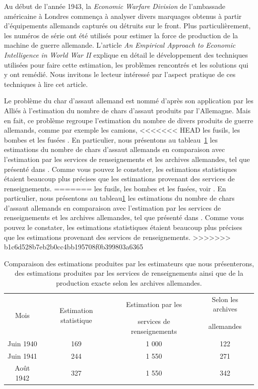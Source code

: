 \documentclass[10pt]{article}
\begin{document}
Au début de l'année 1943, la \emph{Economic Warfare Division} de
l'ambassade américaine à Londres commença à analyser divers marquages
obtenus à partir d'équipements allemands capturés ou détruits sur le
front. Plus particulièrement, les numéros de série ont été utilisés pour
estimer la force de production de la machine de guerre allemande.
L'article \emph{An Empirical Approach to Economic Intelligence in World
War II} \cite{Ruggles1947} explique en détail le développement des
techniques utilisées pour faire cette estimation, les problèmes
rencontrés et les solutions qui y ont remédié. Nous invitons le lecteur
intéressé par l'aspect pratique de ces techniques à lire cet article.

Le problème du char d'assaut allemand est nommé d'après son application
par les Alliés à l'estimation du nombre de chars d'assaut produits par
l'Allemagne. Mais en fait, ce problème regroupe l'estimation du nombre
de divers produits de guerre allemands, comme par exemple les camions,
<<<<<<< HEAD
les fusils, les bombes et les fusées \cite{Ruggles1947}. En particulier,
nous présentons au tableau~\ref{tab:estimation_ruggles} les estimations
du nombre de chars d'assaut allemands en comparaison avec l'estimation
par les services de renseignements et les archives allemandes, tel que
présenté dans \cite{Ruggles1947}. Comme vous pouvez le constater, les
estimations statistiques étaient beaucoup plus précises que les
estimations provenant des services de renseignements.
=======
les fusils, les bombes et les fusées, voir \cite{Ruggles1947}. En
particulier, nous présentons au tableau\ref{tab:estimation_ruggles} les
estimations du nombre de chars d'assaut allemands en comparaison avec
l'estimation par les services de renseignements et les archives
allemandes, tel que présenté dans \cite{Ruggles1947}. Comme vous pouvez
le constater, les estimations statistiques étaient beaucoup plus
précises que les estimations provenant des services de renseignements.
>>>>>>> b1c6d528b7eb2b0cc4bb195708f0b399803a6365

\begin{table}[ht]
\begin{center}
\begin{tabular}{cccc}
\multirow{2}{*}{Mois} & \multirow{2}{*}{Estimation statistique} & Estimation par les & Selon les archives \\
& & services de renseignements &  allemandes \\
\hline
\hline
Juin 1940 & 169 & 1 000 & 122 \\
Juin 1941 & 244 & 1 550 & 271 \\
Août 1942 & 327 & 1 550 & 342 \\
\hline
\end{tabular}
\end{center}
\caption{\label{tab:estimation_ruggles} {Comparaison des estimations produites par les estimateurs que nous présenterons, des estimations produites par les services de renseignements ainsi que de la production exacte selon les archives allemandes.} }
\end{table}
\end{document}
